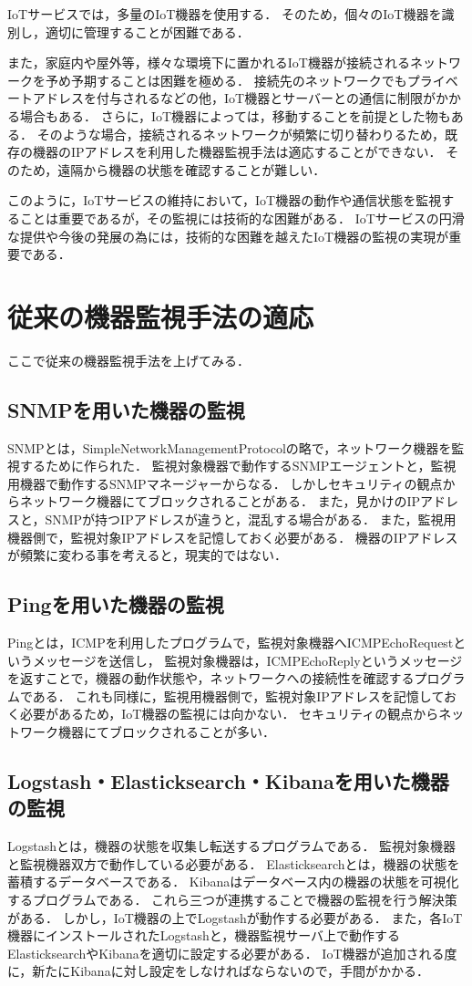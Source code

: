 IoTサービスでは，多量のIoT機器を使用する．
そのため，個々のIoT機器を識別し，適切に管理することが困難である．
\medskip

また，家庭内や屋外等，様々な環境下に置かれるIoT機器が接続されるネットワークを予め予期することは困難を極める．
接続先のネットワークでもプライベートアドレスを付与されるなどの他，IoT機器とサーバーとの通信に制限がかかる場合もある．
さらに，IoT機器によっては，移動することを前提とした物もある．
そのような場合，接続されるネットワークが頻繁に切り替わりるため，既存の機器のIPアドレスを利用した機器監視手法は適応することができない．
そのため，遠隔から機器の状態を確認することが難しい．
\medskip

このように，IoTサービスの維持において，IoT機器の動作や通信状態を監視することは重要であるが，その監視には技術的な困難がある．
IoTサービスの円滑な提供や今後の発展の為には，技術的な困難を越えたIoT機器の監視の実現が重要である．


\section{従来の機器監視手法の適応}
ここで従来の機器監視手法を上げてみる．
\subsection{SNMPを用いた機器の監視}
	SNMPとは，SimpleNetworkManagementProtocolの略で，ネットワーク機器を監視するために作られた．
	監視対象機器で動作するSNMPエージェントと，監視用機器で動作するSNMPマネージャーからなる．
	しかしセキュリティの観点からネットワーク機器にてブロックされることがある．
	また，見かけのIPアドレスと，SNMPが持つIPアドレスが違うと，混乱する場合がある．
	また，監視用機器側で，監視対象IPアドレスを記憶しておく必要がある．
	機器のIPアドレスが頻繁に変わる事を考えると，現実的ではない．
\subsection{Pingを用いた機器の監視}
	Pingとは，ICMPを利用したプログラムで，監視対象機器へICMPEchoRequestというメッセージを送信し，
	監視対象機器は，ICMPEchoReplyというメッセージを返すことで，機器の動作状態や，ネットワークへの接続性を確認するプログラムである．
	これも同様に，監視用機器側で，監視対象IPアドレスを記憶しておく必要があるため，IoT機器の監視には向かない．
	セキュリティの観点からネットワーク機器にてブロックされることが多い．
\subsection{Logstash・Elasticksearch・Kibanaを用いた機器の監視}
	Logstashとは，機器の状態を収集し転送するプログラムである．
	監視対象機器と監視機器双方で動作している必要がある．
	Elasticksearchとは，機器の状態を蓄積するデータベースである．
	Kibanaはデータベース内の機器の状態を可視化するプログラムである．
	これら三つが連携することで機器の監視を行う解決策がある．
	しかし，IoT機器の上でLogstashが動作する必要がある．
	また，各IoT機器にインストールされたLogstashと，機器監視サーバ上で動作するElasticksearchやKibanaを適切に設定する必要がある．
	IoT機器が追加される度に，新たにKibanaに対し設定をしなければならないので，手間がかかる．
